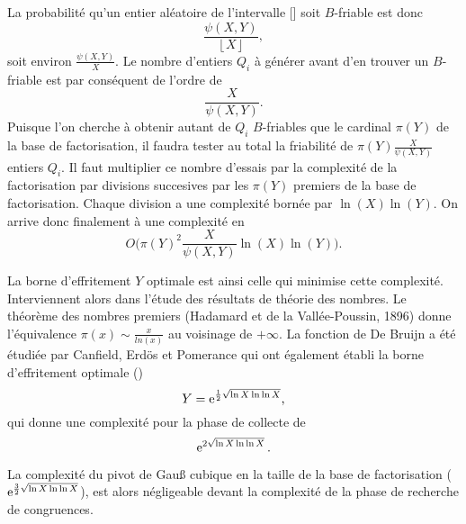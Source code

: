 La \og{} probabilité \fg{} qu'un entier aléatoire de l'intervalle [\![1, X]\!]
soit $B$-friable est donc \[\frac{\psi (X,Y)}{\left\lfloor X \right\rfloor},\]
soit environ $\frac{\psi (X,Y)}{X}$. Le nombre d'entiers $Q_i$ à générer avant
d'en trouver un $B$-friable est par conséquent de l'ordre de
\[\frac{X}{\psi(X,Y)}.\] Puisque l'on cherche à obtenir autant de $Q_i$
$B$-friables que le cardinal $\pi(Y)$ de la base de factorisation, il faudra
tester au total la friabilité de $\pi(Y)\frac{X}{\psi(X,Y)}$ entiers $Q_i$. Il
faut multiplier ce nombre d'essais par la complexité de la factorisation par
divisions succesives par les $\pi(Y)$ premiers de la base de factorisation.
Chaque division a une complexité bornée par $\ln(X)\ln(Y)$. On arrive donc
finalement à une complexité en \[O\big(\pi(Y)^2 \frac{X}{\psi(X,Y)}
\ln(X)\ln(Y)\big).\]

La borne d'effritement $Y$ optimale est ainsi celle qui minimise cette
complexité. Interviennent alors dans l'étude des résultats de théorie des
nombres. Le théorème des nombres premiers (Hadamard et de la Vallée-Poussin,
1896) donne l'équivalence $\pi(x) \sim \frac{x}{ln(x)}$ au voisinage de $+
\infty$. La fonction de De Bruijn a été étudiée par Canfield, Erdös et
Pomerance qui ont également établi la borne d'effritement optimale
(\cite{Tale}) \[ Y = \operatorname{e}^{\frac{1}{2} \sqrt{\ln X \ln \ln X}},\] qui donne une
complexité pour la phase de collecte de \[ \operatorname{e}^{2 \sqrt{\ln X \ln \ln X}}.\] 

La complexité du pivot de Gau\ss{} cubique en la taille de la base de
factorisation ($\operatorname{e}^{\frac{3}{2} \sqrt{\ln X \ln \ln X}}$), est alors
négligeable devant la complexité de la phase de recherche de congruences.
